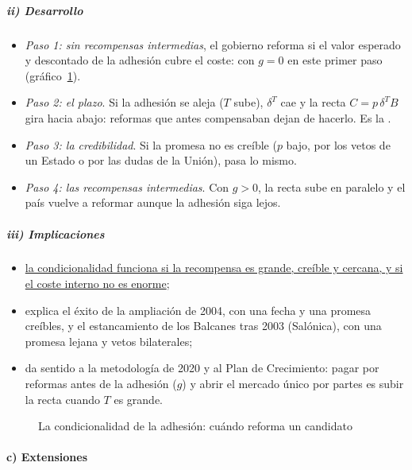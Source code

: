 \documentclass[11pt]{article}
\begin{document}
\subparagraph{ii) Desarrollo}

  \begin{itemize}
  \item \emph{Paso 1: sin recompensas intermedias}, el gobierno reforma si el valor esperado y descontado de la adhesión cubre el coste:
    con $g=0$ en este primer paso (gráfico~\ref{fig:condicionalidad}).
  \item \emph{Paso 2: el plazo}. Si la adhesión se aleja ($T$ sube), $\delta^{T}$ cae y la recta $C=p\,\delta^{T}B$ gira hacia abajo: reformas que antes compensaban dejan de hacerlo. Es la .
  \item \emph{Paso 3: la credibilidad}. Si la promesa no es creíble ($p$ bajo, por los vetos de un Estado o por las dudas de la Unión), pasa lo mismo.
  \item \emph{Paso 4: las recompensas intermedias}. Con $g>0$, la recta sube en paralelo y el país vuelve a reformar aunque la adhesión siga lejos.
  \end{itemize}

\subparagraph{iii) Implicaciones}

  \begin{itemize}
  \item \uline{la condicionalidad funciona si la recompensa es grande, creíble y cercana, y si el coste interno no es enorme};
  \item explica el éxito de la ampliación de 2004, con una fecha y una promesa creíbles, y el estancamiento de los Balcanes tras 2003 (Salónica), con una promesa lejana y vetos bilaterales;
  \item da sentido a la metodología de 2020 y al Plan de Crecimiento: pagar por reformas antes de la adhesión ($g$) y abrir el mercado único por partes es subir la recta cuando $T$ es grande.
  \end{itemize}

\begin{figure}[H]
\centering
\caption{La condicionalidad de la adhesión: cuándo reforma un candidato}\label{fig:condicionalidad}
\end{figure}

\paragraph{c) Extensiones}
\end{document}
